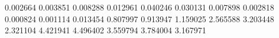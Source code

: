 0.002664
0.003851
0.008288
0.012961
0.040246
0.030131
0.007898
0.002818
0.000824
0.001114
0.013454
0.807997
0.913947
1.159025
2.565588
3.203448
2.321104
4.421941
4.496402
3.559794
3.784004
3.167971
